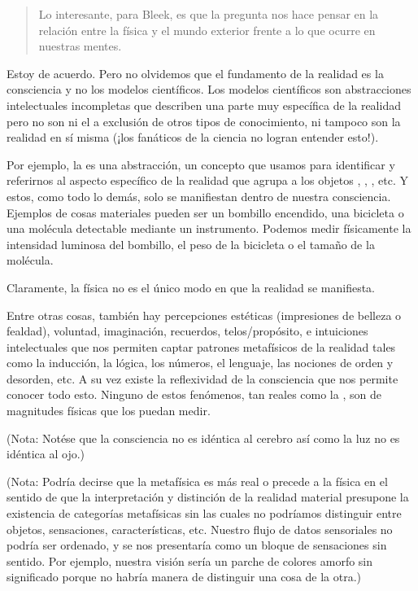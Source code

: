 \documentclass[12pt]{article}
\begin{document}
	\blockquote[]{Lo interesante, para Bleek, es que la pregunta nos hace
	pensar en la relación entre la física y el mundo exterior frente a lo
	que ocurre en nuestras mentes.}
	
	Estoy de acuerdo. Pero no olvidemos que el fundamento de la realidad es
	la consciencia y no los modelos científicos. Los modelos científicos son
	abstracciones intelectuales incompletas que describen una parte muy
	específica de la realidad pero no son ni el  a exclusión de otros tipos de conocimiento, ni tampoco son la
	realidad en sí misma (¡los fanáticos de la ciencia no logran entender
	esto!).
	
	Por ejemplo, la  es una abstracción, un concepto que
	usamos para identificar y referirnos al aspecto específico de la
	realidad que agrupa a los objetos ,
	, , etc. Y estos, como todo lo
	demás, solo se manifiestan dentro de nuestra consciencia. Ejemplos de
	cosas materiales pueden ser un bombillo encendido, una bicicleta o una
	molécula detectable mediante un instrumento. Podemos medir físicamente
	la intensidad luminosa del bombillo, el peso de la bicicleta o el tamaño
	de la molécula.

	Claramente, la física no es el único modo en que la realidad se
	manifiesta.

	Entre otras cosas, también hay percepciones estéticas (impresiones de
	belleza o fealdad), voluntad, imaginación, recuerdos, telos/propósito, e
	intuiciones intelectuales que nos permiten captar patrones metafísicos
	de la realidad tales como la inducción, la lógica, los números, el
	lenguaje, las nociones de orden y desorden, etc. A su vez existe la
	reflexividad de la consciencia que nos permite conocer todo esto.
	Ninguno de estos fenómenos, tan reales como la , son
	de magnitudes físicas que los puedan medir.

	(Nota: Notése que la consciencia no es idéntica al cerebro así como la
	luz no es idéntica al ojo.)

	(Nota: Podría decirse que la metafísica es más real o precede a la
	física en el sentido de que la interpretación y distinción de la
	realidad material presupone la existencia de categorías metafísicas sin
	las cuales no podríamos distinguir entre objetos, sensaciones,
	características, etc. Nuestro flujo de datos sensoriales no podría ser
	ordenado, y se nos presentaría como un bloque de sensaciones sin
	sentido. Por ejemplo, nuestra visión sería un parche de colores amorfo
	sin significado porque no habría manera de distinguir una cosa de la
	otra.)
	
\end{document}
